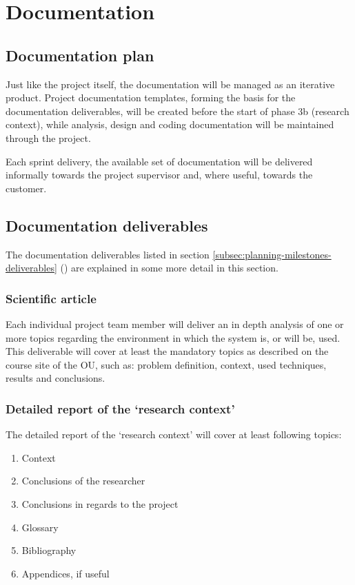 
\section{Documentation}
\label{sec:documentation}
\subsection{Documentation plan}
Just like the project itself, the documentation will be managed as an iterative product.
Project documentation templates, forming the basis for the documentation deliverables, will be created before the start of phase 3b (research context), while analysis, design and coding documentation will be maintained through the project.

Each sprint delivery, the available set of documentation will be delivered informally towards the project supervisor and, where useful, towards the customer.

\subsection{Documentation deliverables}
The documentation deliverables listed in section \ref{subsec:planning-milestones-deliverables} () are explained in some more detail in this section.

\subsubsection{Scientific article}
Each individual project team member will deliver an in depth analysis of one or more topics regarding the environment in which the system is, or will be, used.
This deliverable will cover at least the mandatory topics as described on the course site of the OU, such as: problem definition, context, used techniques, results and conclusions.

\subsubsection{Detailed report of the `research context'}
The detailed report of the `research context' will cover at least following topics:

	\begin{enumerate}
		\item Context
		\item Conclusions of the researcher
		\item Conclusions in regards to the project
		\item Glossary
		\item Bibliography
		\item Appendices, if useful
	\end {enumerate}

